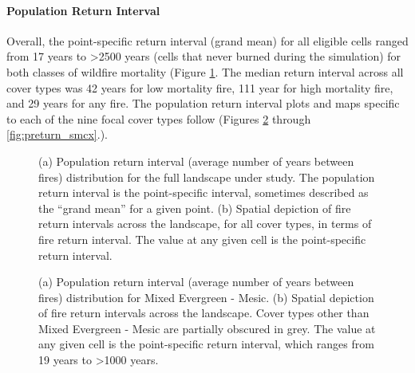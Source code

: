 \paragraph{Population Return Interval}
Overall, the point-specific return interval (grand mean) for all eligible cells ranged from 17 years to \textgreater 2500 years (cells that never burned during the simulation) for both classes of wildfire mortality (Figure \ref{fig:preturn}. The median return interval across all cover types was 42 years for low mortality fire, 111 year for high mortality fire, and 29 years for any fire. The population return interval plots and maps specific to each of the nine focal cover types follow (Figures \ref{fig:preturn_megm} through \ref{fig:preturn_smcx}.).

\begin{figure}[!htbp]
  \centering
  \qquad
  \caption{(a) Population return interval (average number of years between fires) distribution for the full landscape under study. The population return interval is the point-specific interval, sometimes described as the ``grand mean'' for a given point. (b) Spatial depiction of fire return intervals across the landscape, for all cover types, in terms of fire return interval. The value at any given cell is the point-specific return interval.}
  \label{fig:preturn}
\end{figure}


\begin{figure}[!htbp]
  \centering
  \caption{(a) Population return interval (average number of years between fires) distribution for Mixed Evergreen - Mesic. (b) Spatial depiction of fire return intervals across the landscape. Cover types other than Mixed Evergreen - Mesic are partially obscured in grey. The value at any given cell is the point-specific return interval, which ranges from 19 years to \textgreater 1000 years.}
    \label{fig:preturn_megm}
\end{figure}

